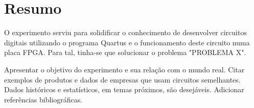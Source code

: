 \chapter{Resumo}
O experimento serviu para solidificar o conhecimento de desenvolver circuitos digitais utilizando o programa Quartus e o funcionamento deste circuito numa placa FPGA. Para tal, tinha-se que solucionar o problema "PROBLEMA X".

Apresentar  o  objetivo  do  experimento e  sua  relação  com  o  mundo  real. 
Citar exemplos  de  produtos  e  dados  de  empresas  que  usam  circuitos  semelhantes. 
Dados  históricos  e  estatísticos,  em  temas  próximos,  são  desejáveis.
Adicionar referências bibliográficas.
